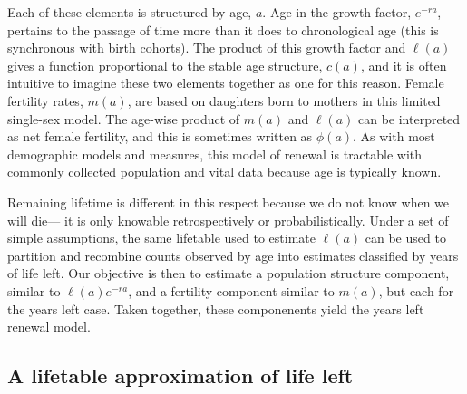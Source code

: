 \documentclass[12pt,oneside,a4paper,leqno]{article}
\begin{document}
Each of these elements is structured by
age, $a$. %
Age in the growth factor, $e^{-ra}$, pertains to the passage of
time more than it does to chronological age (this is synchronous with birth
cohorts). The product of this growth factor and $\ell(a)$ gives a
function proportional to the stable age structure, $c(a)$, and it is often
intuitive to imagine these two elements together as one for this reason. Female
fertility rates, $m(a)$, are based on daughters born to mothers in this limited
single-sex model.  The age-wise product of $m(a)$ and $\ell(a)$
can be interpreted as net female fertility, and this
is sometimes written as $\phi(a)$. As with most demographic models and
measures, this model of renewal is tractable with
commonly collected population and vital data because age is typically known.

Remaining lifetime is different in this respect because we do not know when we
will die--- it is only knowable retrospectively or probabilistically. Under a set of simple assumptions, the same lifetable used to
estimate $\ell(a)$ can be used to
partition and recombine counts observed by age into estimates
classified by years of life left. Our objective is then to estimate a population
structure component, similar to $\ell(a)e^{-ra}$, and a fertility component
similar to $m(a)$, but each for the years left case. Taken together, these
componenents yield the years left renewal model.

\subsection*{A lifetable approximation of life left}
\end{document}
